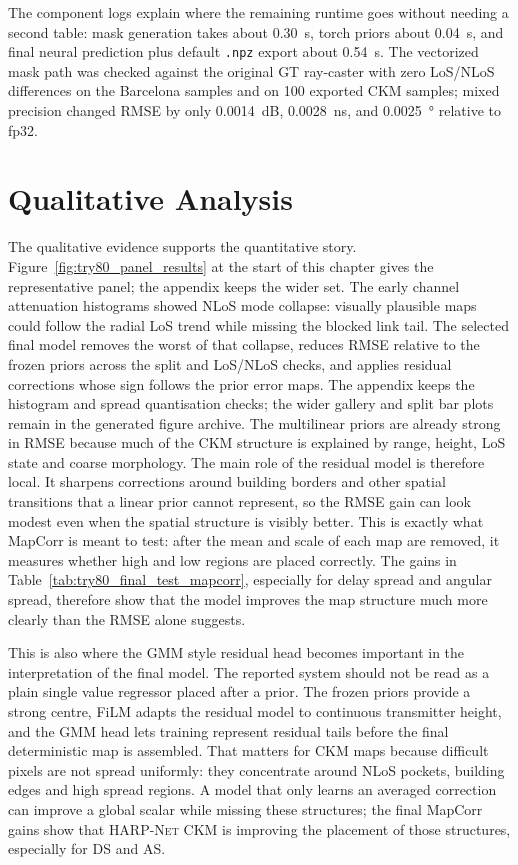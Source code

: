 The component logs explain where the remaining runtime goes without needing a
second table: mask generation takes about \SI{0.30}{s}, torch priors about
\SI{0.04}{s}, and final neural prediction plus default \texttt{.npz} export
about \SI{0.54}{s}. The vectorized mask path was checked against the original
GT ray-caster with zero LoS/NLoS differences on the Barcelona samples and on
100 exported CKM samples; mixed precision changed RMSE by only
\SI{0.0014}{dB}, \SI{0.0028}{ns}, and \SI{0.0025}{\degree} relative to fp32.

\section{Qualitative Analysis}
\label{sec:qualitative_analysis}

The qualitative evidence supports the quantitative story.
Figure~\ref{fig:try80_panel_results} at the start of this chapter gives the
representative panel; the appendix keeps the wider set. The early channel
attenuation histograms showed NLoS mode
collapse: visually plausible maps could follow the radial LoS trend while
missing the blocked link tail. The selected final model removes the worst of
that collapse, reduces RMSE relative to the frozen priors across the split and
LoS/NLoS checks, and applies residual corrections whose sign follows the prior
error maps. The appendix keeps the
histogram and spread quantisation checks; the wider gallery and split bar plots
remain in the generated figure archive.
The multilinear priors are already strong in RMSE because much of the CKM
structure is explained by range, height, LoS state and coarse morphology. The
main role of the residual model is therefore local. It sharpens corrections
around building borders and other spatial transitions that a linear prior cannot
represent, so the RMSE gain can look modest even when the spatial structure is
visibly better. This is exactly what MapCorr is meant to test: after the mean
and scale of each map are removed, it measures whether high and low regions are
placed correctly. The gains in Table~\ref{tab:try80_final_test_mapcorr}, especially
for delay spread and angular spread, therefore show that the model improves the
map structure much more clearly than the RMSE alone suggests.

This is also where the GMM style residual head becomes important in the
interpretation of the final model. The reported system should not be read as a
plain single value regressor placed after a prior. The frozen priors provide a
strong centre, FiLM adapts the residual model to continuous transmitter height,
and the GMM head lets training represent residual tails before the final
deterministic map is assembled. That matters for CKM maps because difficult
pixels are not spread uniformly: they concentrate around NLoS pockets, building
edges and high spread regions. A model that only learns an averaged correction
can improve a global scalar while missing these structures; the final
MapCorr gains show that \textsc{HARP-Net CKM} is improving the placement of
those structures, especially for DS and AS.

